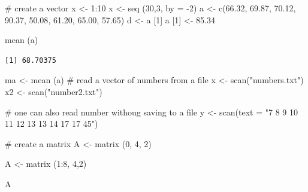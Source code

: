 \documentclass[
  letterpaper,
]{scrbook}
\newenvironment{Shaded}{\begin{snugshade}}{\end{snugshade}}
\newcommand{\AttributeTok}[1]{\textcolor[rgb]{0.40,0.45,0.13}{#1}}
\newcommand{\CommentTok}[1]{\textcolor[rgb]{0.37,0.37,0.37}{#1}}
\newcommand{\DecValTok}[1]{\textcolor[rgb]{0.68,0.00,0.00}{#1}}
\newcommand{\FloatTok}[1]{\textcolor[rgb]{0.68,0.00,0.00}{#1}}
\newcommand{\FunctionTok}[1]{\textcolor[rgb]{0.28,0.35,0.67}{#1}}
\newcommand{\NormalTok}[1]{\textcolor[rgb]{0.00,0.23,0.31}{#1}}
\newcommand{\OtherTok}[1]{\textcolor[rgb]{0.00,0.23,0.31}{#1}}
\newcommand{\SpecialCharTok}[1]{\textcolor[rgb]{0.37,0.37,0.37}{#1}}
\newcommand{\StringTok}[1]{\textcolor[rgb]{0.13,0.47,0.30}{#1}}
\begin{document}
\begin{Shaded}
\begin{Highlighting}[]
\CommentTok{\# create a vector}
\NormalTok{x }\OtherTok{\textless{}{-}} \DecValTok{1}\SpecialCharTok{:}\DecValTok{10}
\NormalTok{x }\OtherTok{\textless{}{-}} \FunctionTok{seq}\NormalTok{ (}\DecValTok{30}\NormalTok{,}\DecValTok{3}\NormalTok{, }\AttributeTok{by =} \SpecialCharTok{{-}}\DecValTok{2}\NormalTok{)}
\NormalTok{a }\OtherTok{\textless{}{-}} \FunctionTok{c}\NormalTok{(}\FloatTok{66.32}\NormalTok{, }\FloatTok{69.87}\NormalTok{, }\FloatTok{70.12}\NormalTok{, }\FloatTok{90.37}\NormalTok{, }\FloatTok{50.08}\NormalTok{, }\FloatTok{61.20}\NormalTok{, }\FloatTok{65.00}\NormalTok{, }\FloatTok{57.65}\NormalTok{)}
\NormalTok{d }\OtherTok{\textless{}{-}}\NormalTok{ a [}\DecValTok{1}\NormalTok{]}
\NormalTok{a [}\DecValTok{1}\NormalTok{] }\OtherTok{\textless{}{-}} \FloatTok{85.34}

\FunctionTok{mean}\NormalTok{ (a)}
\end{Highlighting}
\end{Shaded}

\begin{verbatim}
[1] 68.70375
\end{verbatim}

\begin{Shaded}
\begin{Highlighting}[]
\NormalTok{ma }\OtherTok{\textless{}{-}} \FunctionTok{mean}\NormalTok{ (a)}
\CommentTok{\# read a vector of numbers from a file}
\NormalTok{x }\OtherTok{\textless{}{-}} \FunctionTok{scan}\NormalTok{(}\StringTok{"numbers.txt"}\NormalTok{)}
\NormalTok{x2 }\OtherTok{\textless{}{-}} \FunctionTok{scan}\NormalTok{(}\StringTok{"number2.txt"}\NormalTok{)}

\CommentTok{\# one can also read number withoug saving to a file}
\NormalTok{y }\OtherTok{\textless{}{-}} \FunctionTok{scan}\NormalTok{(}\AttributeTok{text =} \StringTok{"7  8  9 10 11 12 13 13 14 17 17 45"}\NormalTok{)}

\CommentTok{\# create a matrix}
\NormalTok{A }\OtherTok{\textless{}{-}} \FunctionTok{matrix}\NormalTok{ (}\DecValTok{0}\NormalTok{, }\DecValTok{4}\NormalTok{, }\DecValTok{2}\NormalTok{)}

\NormalTok{A }\OtherTok{\textless{}{-}} \FunctionTok{matrix}\NormalTok{ (}\DecValTok{1}\SpecialCharTok{:}\DecValTok{8}\NormalTok{, }\DecValTok{4}\NormalTok{,}\DecValTok{2}\NormalTok{)}

\NormalTok{A}
\end{Highlighting}
\end{Shaded}
\end{document}
